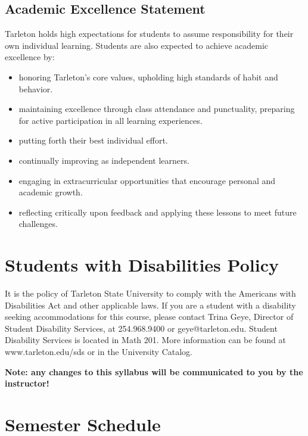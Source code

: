 \documentclass[10pt]{article}
\begin{document}
\subsection*{Academic Excellence Statement}
\label{sec-10-3}
Tarleton holds high expectations for students to assume responsibility for their own individual learning. Students are also expected to achieve academic excellence by:
\begin{itemize}
\item honoring Tarleton’s core values, upholding high standards of habit and behavior.
\item maintaining excellence through class attendance and punctuality, preparing for active participation in all learning experiences.
\item putting forth their best individual effort.
\item continually improving as independent learners.
\item engaging in extracurricular opportunities that encourage personal and academic growth.
\item reflecting critically upon feedback and applying these lessons to meet future challenges.
\end{itemize}

\section*{Students with Disabilities Policy}
\label{sec-11}

It is the policy of Tarleton State University to comply with the Americans
with Disabilities Act and other applicable laws. If you are a student with a
disability seeking accommodations for this course, please contact Trina
Geye, Director of Student Disability Services, at 254.968.9400 or
geye@tarleton.edu. Student Disability Services is
located in Math 201. More information can be found at www.tarleton.edu/sds or in the University Catalog.


\textbf{\textbf{Note:  any changes to this syllabus will be communicated to you by the instructor!}}

\section*{Semester Schedule}
\label{sec-12}
\end{document}
